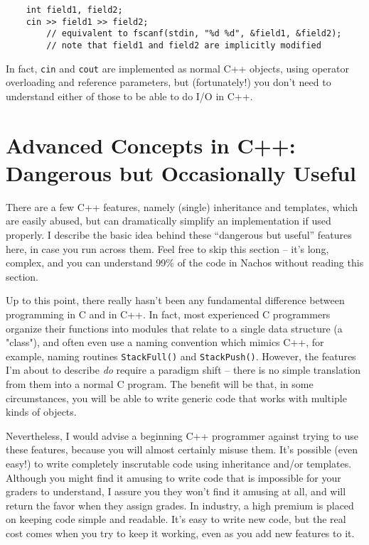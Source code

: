 \begin{enumerate}
\begin{verbatim}
    int field1, field2;
    cin >> field1 >> field2;
        // equivalent to fscanf(stdin, "%d %d", &field1, &field2);
        // note that field1 and field2 are implicitly modified
\end{verbatim}

In fact, {\tt cin} and {\tt cout} are implemented as normal C++
objects, using operator overloading and reference parameters, but
(fortunately!) you don't need to understand either of those to be able
to do I/O in C++.
\end{enumerate}

\section{Advanced Concepts in C++: Dangerous but Occasionally Useful}

There are a few C++ features, namely (single) inheritance and templates,
which are easily abused, but can dramatically simplify an
implementation if used properly.  I describe the basic idea
behind these ``dangerous but useful'' features here, in case you
run across them.  Feel free to skip this section -- it's long,
complex, and you can understand 99\% of the code in Nachos without
reading this section.

Up to this point, there really hasn't been any fundamental difference
between programming in C and in C++.  In fact, most experienced
C programmers organize their functions into modules that relate
to a single data structure (a "class"), and often even use a naming
convention which mimics C++, for example, naming routines
{\tt StackFull()} and {\tt StackPush()}.  However, the features
I'm about to describe {\em do} require a paradigm shift -- there
is no simple translation from them into a normal C program.
The benefit will be that, in some circumstances, you will be able to
write generic code that works with multiple kinds of objects.

Nevertheless, I would advise a beginning C++ programmer against trying
to use these features, because you will almost
certainly misuse them.  It's possible (even easy!) to write completely
inscrutable code using inheritance and/or templates.  Although
you might find it amusing to write code that is impossible for your
graders to understand, I assure you they won't find it amusing at all,
and will return the favor when they assign grades.  In industry,
a high premium is placed on keeping code simple and readable.
It's easy to write new code, but the real cost comes when
you try to keep it working, even as you add new features to it.

